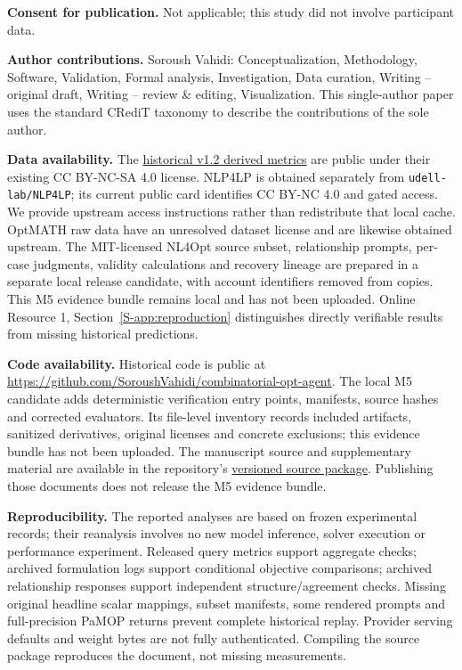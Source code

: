 \documentclass[pdflatex,iicol,sn-basic,Numbered]{sn-jnl}
\begin{document}
\noindent\textbf{Consent for publication.} Not applicable; this study did not involve participant data.

\noindent\textbf{Author contributions.} Soroush Vahidi: Conceptualization, Methodology, Software, Validation, Formal analysis, Investigation, Data curation, Writing -- original draft, Writing -- review \& editing, Visualization. This single-author paper uses the standard CRediT taxonomy to describe the contributions of the sole author.

\noindent\textbf{Data availability.} The \href{https://huggingface.co/datasets/SoroushVahidi/nl-optimization-instantiation-metrics}{historical v1.2 derived metrics} are public under their existing CC BY-NC-SA 4.0 license. NLP4LP is obtained separately from \texttt{udell-lab/NLP4LP}; its current public card identifies CC BY-NC 4.0 and gated access. We provide upstream access instructions rather than redistribute that local cache. OptMATH raw data have an unresolved dataset license and are likewise obtained upstream. The MIT-licensed NL4Opt source subset, relationship prompts, per-case judgments, validity calculations and recovery lineage are prepared in a separate local release candidate, with account identifiers removed from copies. This M5 evidence bundle remains local and has not been uploaded. Online Resource 1, Section~\ref{S-app:reproduction} distinguishes directly verifiable results from missing historical predictions.

\noindent\textbf{Code availability.} Historical code is public at \url{https://github.com/SoroushVahidi/combinatorial-opt-agent}. The local M5 candidate adds deterministic verification entry points, manifests, source hashes and corrected evaluators. Its file-level inventory records included artifacts, sanitized derivatives, original licenses and concrete exclusions; this evidence bundle has not been uploaded. The manuscript source and supplementary material are available in the repository's \href{https://github.com/SoroushVahidi/combinatorial-opt-agent/tree/manuscript/jdsa-final-editorial-polish-20261029/manuscript/jdsa-final-review}{versioned source package}. Publishing those documents does not release the M5 evidence bundle.

\noindent\textbf{Reproducibility.} The reported analyses are based on frozen experimental records; their reanalysis involves no new model inference, solver execution or performance experiment. Released query metrics support aggregate checks; archived formulation logs support conditional objective comparisons; archived relationship responses support independent structure/agreement checks. Missing original headline scalar mappings, subset manifests, some rendered prompts and full-precision PaMOP returns prevent complete historical replay. Provider serving defaults and weight bytes are not fully authenticated. Compiling the source package reproduces the document, not missing measurements.
\end{document}
